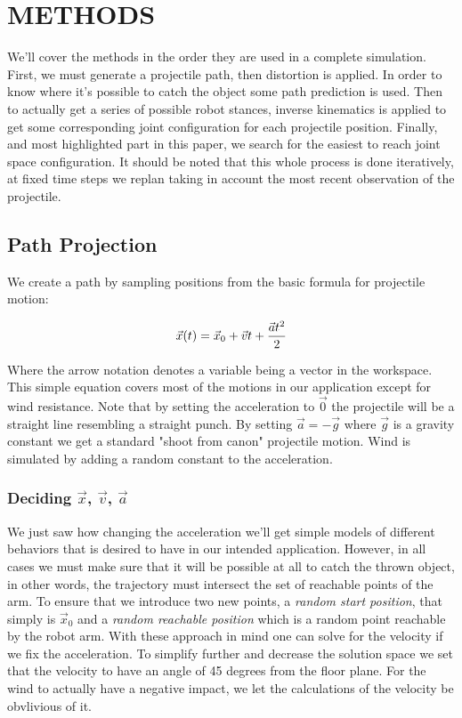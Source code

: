 \documentclass[letterpaper, 10 pt, conference]{ieeeconf}  %
\begin{document}
\section{METHODS}

We'll cover the methods in the order they are used in a complete simulation.
First, we must generate a projectile path, then distortion is applied. In order
to know where it's possible to catch the object some path prediction is used.
Then to actually get a series of possible robot stances, inverse kinematics is
applied to get some corresponding joint configuration for each projectile
position. Finally, and most highlighted part in this paper, we search for the
easiest to reach joint space configuration. It should be noted that this whole
process is done iteratively, at fixed time steps we replan taking in account
the most recent observation of the projectile.

\subsection{Path Projection}

We create a path by sampling positions from the basic formula for projectile motion:

\[
  \vec{x}(t) = \vec{x}_0 + \vec{v}t + {\vec{a}t^2 \over 2}
\]

Where the arrow notation denotes a variable being a vector in the
workspace.  This simple equation covers most of the motions in our
application except for wind resistance. Note that by setting the
acceleration to $\vec{0}$ the projectile will be a straight line
resembling a straight punch. By setting $\vec{a} = -\vec{g}$ where
$\vec{g}$ is a gravity constant we get a standard "shoot from canon"
projectile motion. Wind is simulated by adding a random constant to
the acceleration.

\subsubsection{Deciding $\vec{x}$, $\vec{v}$, $\vec{a}$}

We just saw how changing the acceleration we'll get simple models of
different behaviors that is desired to have in our intended application.
However, in all cases we must make sure that it will be possible at all
to catch the thrown object, in other words, the trajectory must
intersect the set of reachable points of the arm. To ensure that we
introduce two new points, a \emph{random start position}, that simply is
$\vec{x}_0$ and a \emph{random reachable position} which is a random
point reachable by the robot arm. With these approach in mind one can
solve for the velocity if we fix the acceleration. To simplify further
and decrease the solution space we set that the velocity to have an
angle of 45 degrees from the floor plane. For the wind to actually have
a negative impact, we let the calculations of the velocity be obvlivious
of it.
\end{document}
